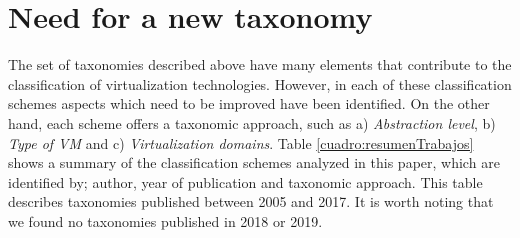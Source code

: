 	\section {Need for a new taxonomy}\label{sec:necesidadDeUnaTaxonomia}
	
	The set of taxonomies described above have many elements that contribute to the classification of virtualization technologies. However, in each of these classification schemes aspects which need to be improved have been identified. On the other hand, each scheme offers a taxonomic approach, such as a) \textit{Abstraction level}, b) \textit{Type of VM} and c) \textit{Virtualization domains}. Table \ref{cuadro:resumenTrabajos} shows a summary of the classification schemes analyzed in this paper, which are identified by; author, year of publication and taxonomic approach. This table describes taxonomies published between 2005 and 2017. It is worth noting that we found no taxonomies published in 2018 or 2019.
	
	
	
